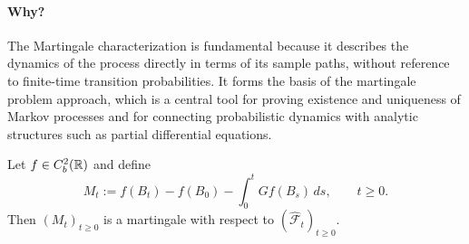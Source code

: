 \paragraph{Why?} The Martingale characterization is fundamental because it describes the dynamics of the process
directly in terms of its sample paths, without reference to finite-time transition
probabilities. It forms the basis of the martingale problem approach, which is a central
tool for proving existence and uniqueness of Markov processes and for connecting
probabilistic dynamics with analytic structures such as partial differential equations.

\begin{proposition}[Proposition 3.2]
Let $f\in C_b^2(\mathbb{R})$ and define
\[
M_t:=f(B_t)-f(B_0)-\int_0^t Gf(B_s)\,ds,
\qquad t\ge0.
\]
Then $(M_t)_{t\ge0}$ is a martingale with respect to $(\widehat{\mathcal F}_t)_{t\ge0}$.
\end{proposition}

